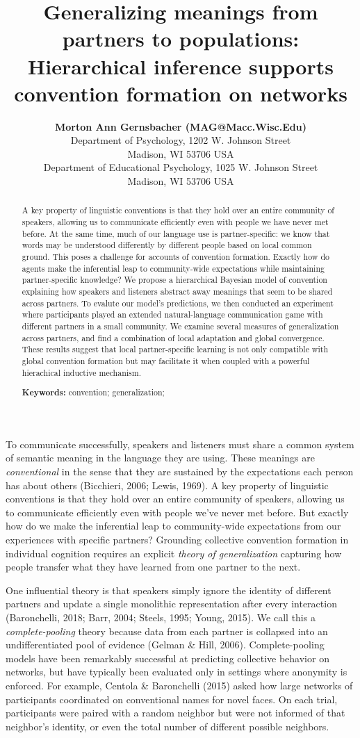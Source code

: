 \documentclass[10pt, letterpaper]{article}
\title{Generalizing meanings from partners to populations:\\
Hierarchical inference supports convention formation on networks}
\author{{\large \bf Morton Ann Gernsbacher (MAG@Macc.Wisc.Edu)} \\ Department of Psychology, 1202 W. Johnson Street \\ Madison, WI 53706 USA \AND {\large \bf Sharon J.~Derry (SDJ@Macc.Wisc.Edu)} \\ Department of Educational Psychology, 1025 W. Johnson Street \\ Madison, WI 53706 USA}
\begin{document}
\maketitle

\begin{abstract}
A key property of linguistic conventions is that they hold over an
entire community of speakers, allowing us to communicate efficiently
even with people we have never met before. At the same time, much of our
language use is partner-specific: we know that words may be understood
differently by different people based on local common ground. This poses
a challenge for accounts of convention formation. Exactly how do agents
make the inferential leap to community-wide expectations while
maintaining partner-specific knowledge? We propose a hierarchical
Bayesian model of convention explaining how speakers and listeners
abstract away meanings that seem to be shared across partners. To
evalute our model's predictions, we then conducted an experiment where
participants played an extended natural-language communication game with
different partners in a small community. We examine several measures of
generalization across partners, and find a combination of local
adaptation and global convergence. These results suggest that local
partner-specific learning is not only compatible with global convention
formation but may facilitate it when coupled with a powerful hierachical
inductive mechanism.

\textbf{Keywords:}
convention; generalization;
\end{abstract}

To communicate successfully, speakers and listeners must share a common
system of semantic meaning in the language they are using. These
meanings are \emph{conventional} in the sense that they are sustained by
the expectations each person has about others (Bicchieri, 2006; Lewis,
1969). A key property of linguistic conventions is that they hold over
an entire community of speakers, allowing us to communicate efficiently
even with people we've never met before. But exactly how do we make the
inferential leap to community-wide expectations from our experiences
with specific partners? Grounding collective convention formation in
individual cognition requires an explicit \emph{theory of
generalization} capturing how people transfer what they have learned
from one partner to the next.

One influential theory is that speakers simply ignore the identity of
different partners and update a single monolithic representation after
every interaction (Baronchelli, 2018; Barr, 2004; Steels, 1995; Young,
2015). We call this a \emph{complete-pooling} theory because data from
each partner is collapsed into an undifferentiated pool of evidence
(Gelman \& Hill, 2006). Complete-pooling models have been remarkably
successful at predicting collective behavior on networks, but have
typically been evaluated only in settings where anonymity is enforced.
For example, Centola \& Baronchelli (2015) asked how large networks of
participants coordinated on conventional names for novel faces. On each
trial, participants were paired with a random neighbor but were not
informed of that neighbor's identity, or even the total number of
different possible neighbors.
\end{document}
